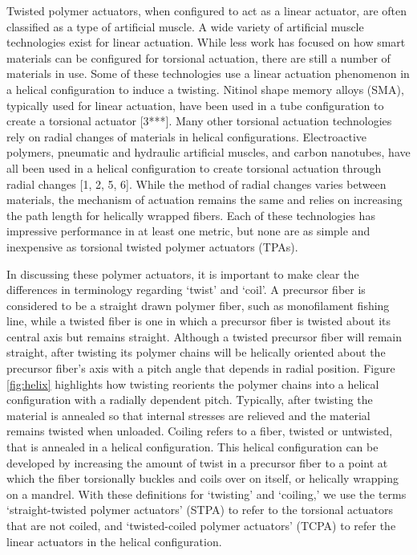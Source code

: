 \documentclass[twocolumn,10pt]{asme2e}
\begin{document}
Twisted polymer actuators, when configured to act as a linear actuator, are often classified as a type of artificial muscle. A wide variety of artificial muscle technologies exist for linear actuation. While less work has focused on how smart materials can be configured for torsional actuation, there are still a number of materials in use. Some of these technologies use a linear actuation phenomenon in a helical configuration to induce a twisting. Nitinol shape memory alloys (SMA), typically used for linear actuation, have been used in a tube configuration to create a torsional actuator [3***]. Many other torsional actuation technologies rely on  radial changes of materials in helical configurations. Electroactive polymers, pneumatic and hydraulic artificial muscles, and carbon nanotubes, have all been used in a helical configuration to create torsional actuation through radial changes [1, 2, 5, 6]. While the method of radial changes varies between materials, the mechanism of actuation remains the same and relies on increasing the path length for helically wrapped fibers. Each of these technologies has impressive performance in at least one metric, but none are as simple and inexpensive as torsional twisted polymer actuators (TPAs).

In discussing these polymer actuators, it is important to make clear the differences in terminology regarding `twist' and `coil'. A precursor fiber is considered to be a straight drawn polymer fiber, such as monofilament fishing line, while a twisted fiber is one in which a precursor fiber is twisted about its central axis but remains straight. Although a twisted precursor fiber will remain straight, after twisting its polymer chains will be helically oriented about the precursor fiber's axis with a pitch angle that depends in radial position. Figure \ref{fig:helix} highlights how twisting reorients the polymer chains into a helical configuration with a radially dependent pitch. Typically, after twisting the material is annealed so that internal stresses are relieved and the material remains twisted when unloaded. Coiling refers to a fiber, twisted or untwisted, that is annealed in a helical configuration. This helical configuration can be developed by increasing the amount of twist in a precursor fiber to a point at which the fiber torsionally buckles and coils over on itself, or helically wrapping on a mandrel. With these definitions for `twisting' and `coiling,' we use the terms `straight-twisted polymer actuators' (STPA) to refer to the torsional actuators that are not coiled, and `twisted-coiled polymer actuators' (TCPA) to refer the linear actuators in the helical configuration. 
\end{document}
